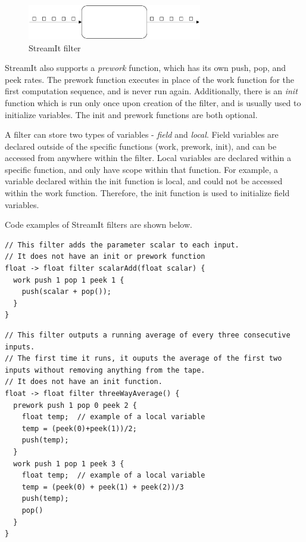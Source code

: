 \begin{figure}[bthp]
  \centering
  \includegraphics[width=3.0in]{figures/filter.eps}
  \caption{StreamIt filter}
  \label{fig:filter}
\end{figure}

    StreamIt also supports a \textit{prework} function, which has its own push,
pop, and peek rates.  The prework function executes in place of
the work function for the first computation sequence, and is never
run again. Additionally, there is an \textit{init} function which
is run only once upon creation of the filter, and is usually used
to initialize variables.  The init and prework functions are both
optional.

        A filter can store two types of variables - \textit{field} and
\textit{local}. Field variables are declared outside of the
specific functions (work, prework, init), and can be accessed from
anywhere within the filter. Local variables are declared within a
specific function, and only have scope within that function. For
example, a variable declared within the init function is local,
and could not be accessed within the work function. Therefore, the
init function is used to initialize field variables.

Code examples of StreamIt filters are shown below.

\begin{scriptsize}
\begin{singlespace}
\begin{verbatim}
// This filter adds the parameter scalar to each input.
// It does not have an init or prework function
float -> float filter scalarAdd(float scalar) {
  work push 1 pop 1 peek 1 {
    push(scalar + pop());
  }
}
\end{verbatim}
\end{singlespace}
\end{scriptsize}

\begin{scriptsize}
\begin{singlespace}
\begin{verbatim}
// This filter outputs a running average of every three consecutive inputs.
// The first time it runs, it ouputs the average of the first two inputs without removing anything from the tape.
// It does not have an init function.
float -> float filter threeWayAverage() {
  prework push 1 pop 0 peek 2 {
    float temp;  // example of a local variable
    temp = (peek(0)+peek(1))/2;
    push(temp);
  }
  work push 1 pop 1 peek 3 {
    float temp;  // example of a local variable
    temp = (peek(0) + peek(1) + peek(2))/3
    push(temp);
    pop()
  }
}
\end{verbatim}
\end{singlespace}
\end{scriptsize}

